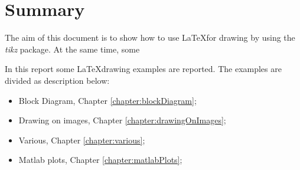 \chapter{Summary}

The aim of this document is to show how to use \LaTeX for drawing by using the \textit{tikz} 
package. At the same time, some

In this report some \LaTeX drawing examples are reported. The examples are divided as description below:

\begin{itemize}
	\item Block Diagram, Chapter \ref{chapter:blockDiagram};
	\item Drawing on images, Chapter \ref{chapter:drawingOnImages};
	\item Various, Chapter \ref{chapter:various};
	\item Matlab plots, Chapter \ref{chapter:matlabPlots};
\end{itemize}
